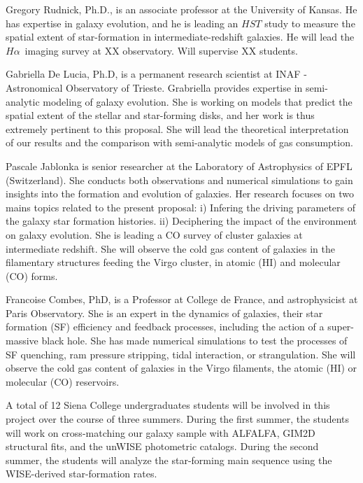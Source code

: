 \documentclass[11pt, preprint]{aastex}
\newcommand{\ha}{$H\alpha$}
\begin{document}
{Gregory Rudnick, Ph.D., is an associate professor at the University of
Kansas.  He has expertise in galaxy evolution, and he is leading an
$HST$ study to measure the spatial extent of star-formation in
intermediate-redshift galaxies.  He will lead the \ha \ imaging survey
at XX observatory.   Will supervise XX students.


Gabriella De Lucia, Ph.D, is a permanent research scientist at INAF -
Astronomical Observatory of Trieste.  Grabriella provides expertise in
semi-analytic modeling of galaxy evolution. She is working on models
that predict the spatial extent of the stellar and star-forming disks,
and her work is thus extremely pertinent to this proposal.  She will lead
the theoretical interpretation of our results and the comparison
with semi-analytic models of gas consumption.

Pascale Jablonka is senior researcher at the Laboratory of
Astrophysics of EPFL (Switzerland). She conducts both observations and
numerical simulations to gain insights into the formation and
evolution of galaxies. Her research focuses on two mains
topics related to the present proposal: i) Infering the driving
parameters of the galaxy star formation histories. ii) Deciphering the
impact of the environment on galaxy evolution. She is leading a CO
survey of cluster galaxies at intermediate redshift. She will observe
the cold gas content of galaxies in the filamentary structures feeding
the Virgo cluster, in atomic (HI) and molecular (CO) forms.


Francoise Combes, PhD, is a Professor at College de France, and astrophysicist at Paris Observatory. She is an expert in the dynamics of galaxies, their star formation (SF) efficiency and feedback processes, including the action of a super-massive black hole. She has made numerical simulations to test the processes of SF quenching, ram pressure stripping, tidal interaction, or strangulation. She will observe the cold gas content of galaxies in the Virgo filaments, the atomic (HI) or molecular (CO) reservoirs.



A total of 12 Siena College undergraduates students will be involved
in this project over the course of three summers.  During the first
summer, the students will work on cross-matching our galaxy sample
with ALFALFA, GIM2D structural fits, and the unWISE photometric catalogs.  During the second summer, the
students will analyze the star-forming main sequence using the
WISE-derived star-formation rates.

}
\end{document}
